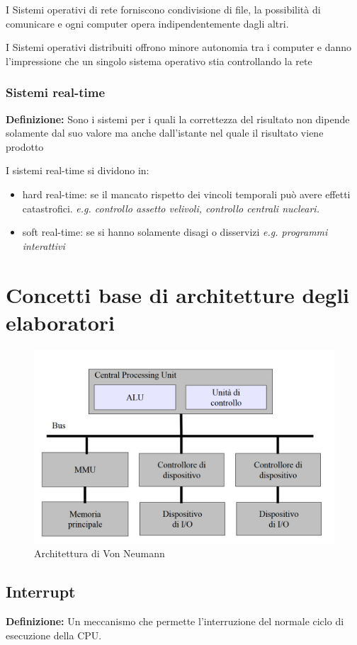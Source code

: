 I Sistemi operativi di rete forniscono condivisione di file, la possibilità di comunicare e ogni computer opera indipendentemente dagli altri.

I Sistemi operativi distribuiti offrono minore autonomia tra i computer e danno l'impressione che un singolo sistema operativo stia controllando la rete

\subsubsection{Sistemi real-time}
\textbf{Definizione:} Sono i sistemi per i quali la correttezza del risultato non dipende solamente dal suo valore ma anche dall'istante nel quale il risultato viene prodotto

I sistemi real-time si dividono in:
\begin{itemize}
    \item hard real-time: se il mancato rispetto dei vincoli temporali può avere effetti catastrofici. \textit{e.g. controllo assetto velivoli, controllo centrali nucleari.}
    \item soft real-time: se si hanno solamente disagi o disservizi \textit{e.g. programmi interattivi}
\end{itemize}

\newpage
\section{Concetti base di architetture
degli elaboratori}

\begin{figure} [h]
    \centering
    \includegraphics[width=0.5\linewidth]{Images/Screenshot 2024-12-16 125618.png}
    \caption{Architettura di Von Neumann}
    \label{fig:von-neumann1}
\end{figure}

\subsection{Interrupt}
\textbf{Definizione:} Un meccanismo che permette l'interruzione del normale ciclo di esecuzione della CPU.

